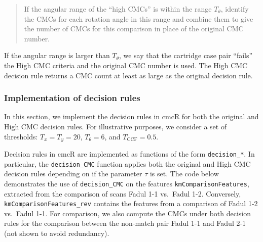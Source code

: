 \documentclass[11pt,]{isuthesis}
\begin{document}
\begin{quote}
If the angular range of the ``high CMCs'' is within the range \(T_\theta\), identify the CMCs for each rotation angle in this range and combine them to give the number of CMCs for this comparison in place of the original CMC number.
\end{quote}

If the angular range is larger than \(T_\theta\), we say that the cartridge case pair ``fails'' the High CMC criteria and the original CMC number is used.
The High CMC decision rule returns a CMC count at least as large as the original decision rule.

\hypertarget{decisionRuleImplementation}{%
\subsubsection{Implementation of decision rules}\label{decisionRuleImplementation}}

In this section, we implement the decision rules in cmcR for both the original and High CMC decision rules.
For illustrative purposes, we consider a set of thresholds: \(T_x = T_y = 20\), \(T_{\theta} = 6\), and \(T_{\text{CCF}} = 0.5\).

Decision rules in cmcR are implemented as functions of the form \texttt{decision\_*}.
In particular, the \texttt{decision\_CMC} function applies both the original and High CMC decision rules depending on if the parameter \(\tau\) is set.
The code below demonstrates the use of \texttt{decision\_CMC} on the features \texttt{kmComparisonFeatures}, extracted from the comparison of scans Fadul 1-1 vs.~Fadul 1-2.
Conversely, \texttt{kmComparisonFeatures\_rev} contains the features from a comparison of Fadul 1-2 vs.~Fadul 1-1.
For comparison, we also compute the CMCs under both decision rules for the comparison between the non-match pair Fadul 1-1 and Fadul 2-1 (not shown to avoid redundancy).
\end{document}
